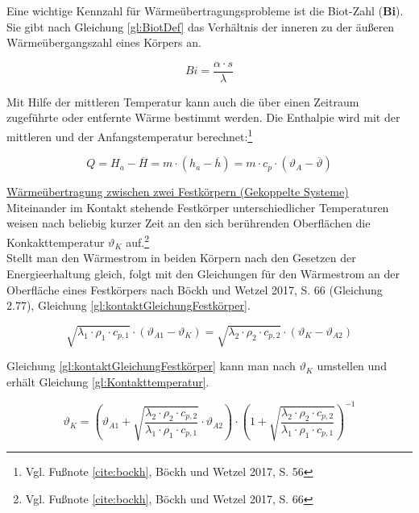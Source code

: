 Eine wichtige Kennzahl für Wärmeübertragungsprobleme ist die Biot-Zahl (\textbf{Bi}). Sie gibt nach Gleichung \ref{gl:BiotDef} das Verhältnis der inneren zu der äußeren Wärmeübergangszahl eines Körpers an.

\begin{equation}
	Bi = \frac{\alpha \cdot s}{\lambda} \label{gl:BiotDef}
\end{equation}

Mit Hilfe der mittleren Temperatur kann auch die über einen Zeitraum zugeführte oder entfernte Wärme bestimmt werden. Die Enthalpie wird mit der mittleren und der Anfangstemperatur berechnet:\footnote{Vgl. Fußnote \ref{cite:bockh}, Böckh und Wetzel 2017, S. 56}

\begin{equation}
	Q = H_{a} - \overline{H} = m \cdot (h_{a} - \overline{h}) = m \cdot c_{p} \cdot (\vartheta_{A} - \overline{\vartheta}) \label{gl:gesamtWaermeUebertragen}
\end{equation}

\underline{Wärmeübertragung zwischen zwei Festkörpern (Gekoppelte Systeme)}
\\

Miteinander im Kontakt stehende Festkörper unterschiedlicher Temperaturen weisen nach beliebig kurzer Zeit an den sich berührenden Oberflächen die Konkakttemperatur $\vartheta_{K}$ auf.\footnote{Vgl. Fußnote \ref{cite:bockh}, Böckh und Wetzel 2017, S. 66} \\
Stellt man den Wärmestrom in beiden Körpern nach den Gesetzen der Energieerhaltung gleich, folgt mit den Gleichungen für den Wärmestrom an der Oberfläche eines Festkörpers nach Böckh und Wetzel 2017, S. 66 (Gleichung 2.77), Gleichung \ref{gl:kontaktGleichungFestkörper}.

\begin{equation}
	\sqrt{\lambda_{1} \cdot \rho_{1} \cdot c_{p,1}} \cdot (\vartheta_{A1} - \vartheta_{K}) = \sqrt{\lambda_{2} \cdot \rho_{2} \cdot c_{p,2}} \cdot (\vartheta_{K} - \vartheta_{A2}) \label{gl:kontaktGleichungFestkörper}
\end{equation}

Gleichung \ref{gl:kontaktGleichungFestkörper} kann man nach $\vartheta_{K}$ umstellen und erhält Gleichung \ref{gl:Kontakttemperatur}.

\begin{equation}
	\vartheta_{K} = \left( \vartheta_{A1} + \sqrt{\frac{\lambda_{2} \cdot \rho_{2} \cdot c_{p,2}}{\lambda_{1} \cdot \rho_{1} \cdot c_{p,1}}} \cdot \vartheta_{A2} \right) \cdot \left( 1 + \sqrt{\frac{\lambda_{2} \cdot \rho_{2} \cdot c_{p,2}}{\lambda_{1} \cdot \rho_{1} \cdot c_{p,1}}} \right)^{-1} \label{gl:Kontakttemperatur}
\end{equation}
 
